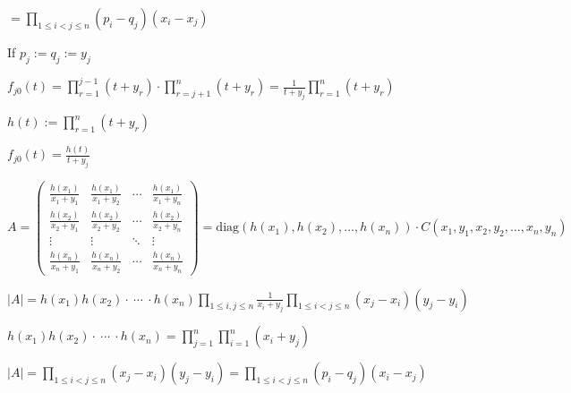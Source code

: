 \documentclass{article}
\begin{document}
\( = \prod_{1 \leq i < j \leq n} (p_i - q_j)(x_i-x_j) \)

If \( p_j := q_j := y_j \)

\( f_{j0}(t) = \prod_{r=1}^{j-1}(t+y_r) \cdot \prod_{r=j+1}^{n}(t+y_r) = \frac{1}{t+y_j} \prod_{r=1}^{n}(t+y_r) \)

\( h(t) := \prod_{r=1}^{n}(t+y_r) \)

\( f_{j0}(t) = \frac{h(t)}{t+y_j} \)

\( A = \left(\begin{matrix}\frac{h(x_1)}{x_1+y_1} & \frac{h(x_1)}{x_1+y_2} & \cdots & \frac{h(x_1)}{x_1+y_n} \\ \frac{h(x_2)}{x_2+y_1} & \frac{h(x_2)}{x_2+y_2} & \cdots & \frac{h(x_2)}{x_2+y_n} \\ \vdots & \vdots & \ddots & \vdots \\ \frac{h(x_n)}{x_n+y_1} & \frac{h(x_n)}{x_n+y_2} & \cdots & \frac{h(x_n)}{x_n+y_n} \end{matrix}\right) = \mathrm{diag}(h(x_1),h(x_2),\ldots,h(x_n)) \cdot C(x_1,y_1,x_2,y_2,\ldots,x_n, y_n) \)

\( |A| = h(x_1)h(x_2) \cdot\ \cdots\ \cdot h(x_n) \prod_{1 \leq i,j \leq n}\frac{1}{x_i+y_j} \prod_{1 \leq i < j \leq n} (x_j-x_i)(y_j-y_i) \)

\( h(x_1)h(x_2) \cdot\ \cdots\ \cdot h(x_n) = \prod_{j=1}^n\prod_{i=1}^n(x_i + y_j) \)

\( |A| = \prod_{1 \leq i < j \leq n} (x_j-x_i)(y_j-y_i) = \prod_{1 \leq i < j \leq n} (p_i-q_j)(x_i-x_j) \)
\end{document}
